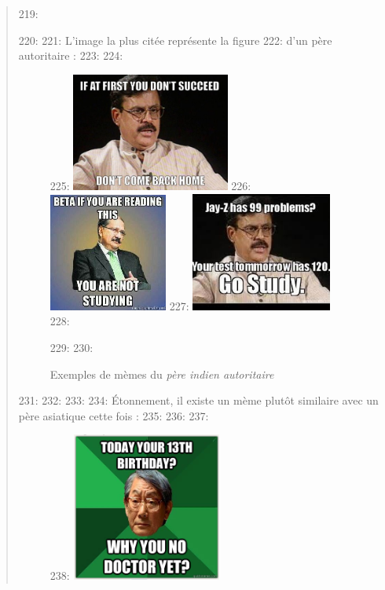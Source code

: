 \begin{quote}
\begin{itemize}
219: \end{itemize}
220: 
221: L{\textquoteright}image la plus cit\'ee repr\'esente la figure
222: d{\textquoteright}un p\`ere autoritaire :
223: 
224: \begin{figure}
225:     \includegraphics[width=2.0449in,height=1.5335in]{figures/chap2/chapitre2-img8.jpg}
226:     \includegraphics[width=1.5335in,height=1.5335in]{figures/chap2/chapitre2-img9.jpg}
227:     \includegraphics[width=1.8224in,height=1.5449in]{figures/chap2/chapitre2-img10.jpg}
228:     \caption[\textit{"High Expectations Indian Father"} d'après Quora.com]{Exemples de m\`emes du \textit{p\`ere indien autoritaire}}
229:     \label{fig:severe-indian-dad}
230: \end{figure}
231: 
232: 
233: 
234: \'Etonnement, il existe un m\`eme plut\^ot similaire avec un p\`ere asiatique cette fois : 
235: 
236: 
237: \begin{figure}
238:     \includegraphics[width=1.9335in,height=1.9224in]{figures/chap2/chapitre2-img11.png}

\end{figure}
\end{quote}

